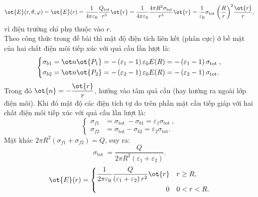 \begin{loigiai}
\begin{enumerate}[1)]
\begin{enumerate}[a)]
        \[\ot{E}(r,\theta ,\varphi )=\ot{E}(r)=\dfrac{1}{4\pi {{\varepsilon }_{0}}}\dfrac{{{Q}_{\text{tot}}}}{{{r}^{3}}}\ot{r}=\dfrac{1}{4\pi {{\varepsilon }_{0}}}\dfrac{4\pi {{R}^{2}}{{\sigma }_{\text{tot}}}}{{{r}^{3}}}\ot{r}=\dfrac{1}{{{\varepsilon }_{0}}}{{\sigma }_{\text{tot }}}{{\left( \dfrac{R}{r} \right)}^{2}}\dfrac{{\ot{r}}}{r}, \label{**}\]
        vì điện trường chỉ phụ thuộc vào $r$.
        \\Theo công thức trong đề bài thì mật độ điện tích liên kết (phân cực) ở bề mặt của hai chất điện môi tiếp xúc với quả cầu lần lượt là:
            \[\left\{ \begin{aligned}
          {\sigma _{b1}} &= \ot n{{\ot{P_1}}} =  - \left( {{\varepsilon _1} - 1} \right){\varepsilon _0}E(R) =  - \left( {{\varepsilon _1} - 1} \right){\sigma _{{\text{tot }}}},  \\
          {\sigma _{b2}} &= \ot n\ot {{P_2}}  =  - \left( {{\varepsilon _2} - 1} \right){\varepsilon _0}E(R) =  - \left( {{\varepsilon _2} - 1} \right){\sigma _{{\text{tot}}}}. 
        \end{aligned}  \right.\]
        Trong đó $\ot{n}=-\dfrac{{\ot{r}}}{r}$, hướng vào tâm quả cầu (hay hướng ra ngoài lớp điện môi).
        Khi đó mật độ các điện tích tự do trên phần mặt cầu tiếp giáp với hai chất điện môi tiếp xúc với quả cầu lần lượt là:
            \[\left\{ \begin{aligned}
          {\sigma _{f1}} &= {\sigma _{{\text{tot }}}} - {\sigma _{b1}} = {\varepsilon _1}{\sigma _{{\text{tot }}}}, \\
          {\sigma _{f2}} &= {\sigma _{{\text{tot}}}} - {\sigma _{b2}} = {\varepsilon _2}{\sigma _{{\text{tot}}}}.
        \end{aligned}  \right.\]
        Mặt khác $2\pi {{R}^{2}}\left( {{\sigma }_{f1}}+{{\sigma }_{f2}} \right)=Q$, suy ra:
        \[{{\sigma }_{\text{tot }}}=\dfrac{Q}{2\pi {{R}^{2}}\left( {{\varepsilon }_{1}}+{{\varepsilon }_{2}} \right)}.\]
        \[\ot{E}(r)=\left\{ \begin{aligned}
        \dfrac{1}{2\pi {{\varepsilon }_{0}}}\dfrac{Q}{\left( {{\varepsilon }_{1}}+{{\varepsilon }_{2}} \right){{r}^{2}}}\ot{r}\quad  & r\ge R,  \\
         0 \quad & 0<r<R. 
        \end{aligned} \right.\]
            

\end{enumerate}
\end{enumerate}
\end{loigiai}
